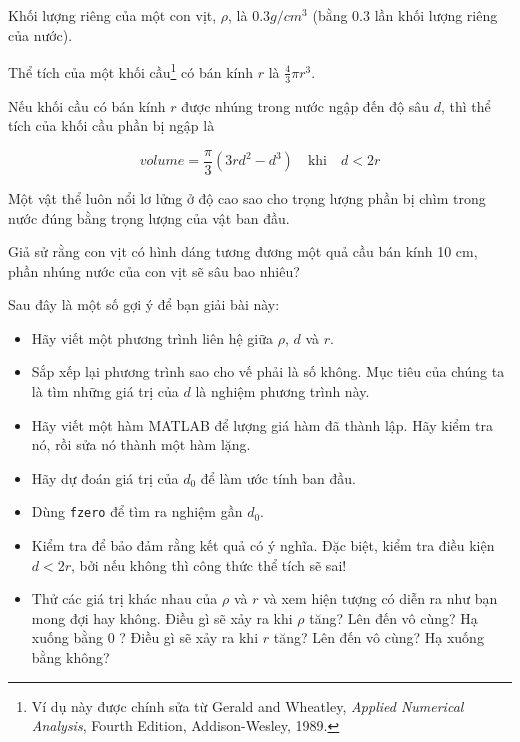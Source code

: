 \documentclass[12pt]{book}
\begin{document}
\begin{ex}
\label{duck}

Khối lượng riêng của một con vịt, $\rho$, là $0.3 g / cm^3$ (bằng 0.3 
lần khối lượng riêng của nước).

Thể tích của một khối cầu\footnote{Ví dụ này được chính sửa từ Gerald
and Wheatley, {\em Applied Numerical Analysis}, Fourth Edition,
Addison-Wesley, 1989.} có bán kính $r$ là $\frac{4}{3} \pi r^3$.

Nếu khối cầu có bán kính $r$ được nhúng trong nước ngập đến độ sâu $d$, 
thì thể tích của khối cầu phần bị ngập là

\[ volume = \frac{\pi}{3} (3r d^2 - d^3) \quad 
\mbox{khi} \quad d < 2 r \]

Một vật thể luôn nổi lơ lửng ở độ cao sao cho trọng lượng phần bị chìm 
trong nước đúng bằng trọng lượng của vật ban đầu.

Giả sử rằng con vịt có hình dáng tương đương một quả cầu bán kính 10 cm,
phần nhúng nước của con vịt sẽ sâu bao nhiêu?

Sau đây là một số gợi ý để bạn giải bài này:

\begin{itemize}

\item Hãy viết một phương trình liên hệ giữa $\rho$, $d$ và $r$.

\item Sắp xếp lại phương trình sao cho vế phải là số không.
Mục tiêu của chúng ta là tìm những giá trị của $d$ là nghiệm phương trình này.

\item Hãy viết một hàm MATLAB để lượng giá hàm đã thành lập. Hãy kiểm tra
   nó, rồi sửa nó thành một hàm lặng.

\item Hãy dự đoán giá trị của $d_0$ để làm ước tính ban đầu.

\item Dùng {\tt fzero} để tìm ra nghiệm gần $d_0$.

\item Kiểm tra để bảo đảm rằng kết quả có ý nghĩa. Đặc biệt, kiểm tra
   điều kiện $d < 2 r$, bởi nếu không thì công thức thể tích sẽ sai!

\item Thử các giá trị khác nhau của $\rho$ và $r$ và xem hiện tượng có diễn ra
như bạn mong đợi hay không. Điều gì sẽ xảy ra khi $\rho$ tăng? Lên đến
vô cùng? Hạ xuống bằng 0 ? Điều gì sẽ xảy ra khi $r$ tăng?  Lên đến vô cùng?
Hạ xuống bằng không?

\end{itemize}


\end{ex}
\end{document}
